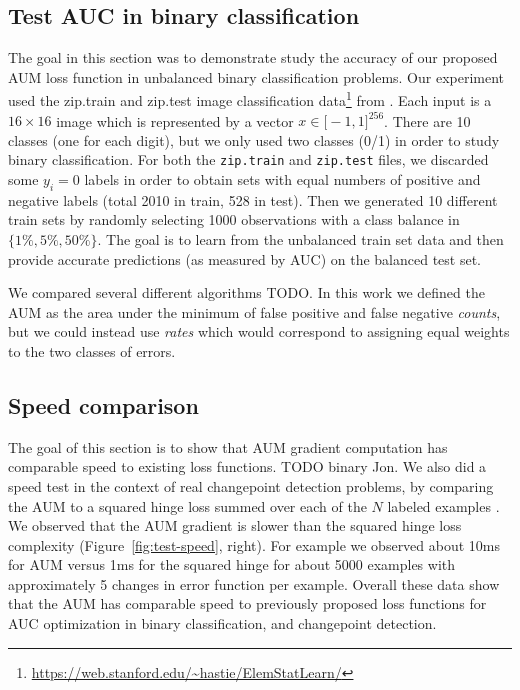 \documentclass{article}
\begin{document}
\subsection{Test AUC in binary classification}

The goal in this section was to demonstrate study the accuracy of our proposed AUM loss function in unbalanced binary classification problems.
Our experiment used the zip.train and zip.test image classification data\footnote{\url{https://web.stanford.edu/~hastie/ElemStatLearn/}} from \citep{Hastie2009}.
Each input is a $16\times 16$ image which is represented by a vector $x\in\mathbb [-1,1]^{256}$.
There are 10 classes (one for each digit), but we only used two classes (0/1) in order to study binary classification.
For both the \texttt{zip.train} and \texttt{zip.test} files, we discarded some $y_i=0$ labels in order to obtain sets with equal numbers of positive and negative labels (total 2010 in train, 528 in test).
Then we generated 10 different train sets by randomly selecting 1000 observations with a class balance in $\{1\%, 5\%, 50\%\}$.
The goal is to learn from the unbalanced train set data and then provide accurate predictions (as measured by AUC) on the balanced test set.

We compared several different algorithms TODO.
In this work we defined the AUM as the area under the minimum of false positive and false negative \emph{counts}, but we could instead use \emph{rates} which would correspond to assigning equal weights to the two classes of errors.



\subsection{Speed comparison}

The goal of this section is to show that AUM gradient computation has comparable speed to existing loss functions. 
TODO binary Jon.
We also did a speed test in the context of real changepoint detection problems, by comparing the AUM to a squared hinge loss summed over each of the $N$ labeled examples \citep{Hocking2013icml}. 
We observed that the AUM gradient is slower than the squared hinge loss complexity (Figure~\ref{fig:test-speed}, right).
For example we observed about 10ms for AUM versus 1ms for the squared hinge for about 5000 examples with approximately 5 changes in error function per example.
Overall these data show that the AUM has comparable speed to previously proposed loss functions for AUC  optimization in binary classification, and changepoint detection.
\end{document}

